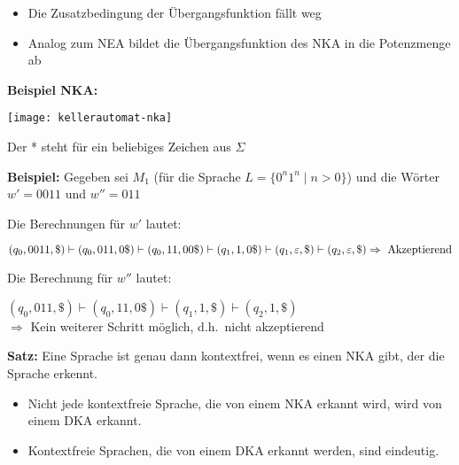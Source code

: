 \begin{itemize}
    \item Die Zusatzbedingung der Übergangsfunktion fällt weg
    \item Analog zum NEA bildet die Übergangsfunktion des NKA in die Potenzmenge ab
\end{itemize}

\textbf{Beispiel NKA:}

\texttt{[image: kellerautomat-nka]}

Der * steht für ein beliebiges Zeichen aus $\Sigma$

\textbf{Beispiel:} Gegeben sei $M_1$ (für die Sprache $L = \{ 0^n 1^n \mid n > 0 \}$) und die Wörter $w' = 0011$ und $w'' = 011$

Die Berechnungen für $w'$ lautet:

$(q_0, 0011, \$) \vdash (q_0, 011, 0\$) \vdash (q_0, 11, 00\$) \vdash (q_1, 1, 0\$) \vdash (q_1, \varepsilon, \$) \vdash (q_2, \varepsilon, \$) \\
\Rightarrow \text{ Akzeptierend}$

Die Berechnung für $w''$ lautet:

$(q_0, 011, \$) \vdash (q_0, 11, 0\$) \vdash (q_1, 1, \$) \vdash (q_2, 1, \$)$ \\
$\Rightarrow$ Kein weiterer Schritt möglich, d.h.\ nicht akzeptierend

\textbf{Satz:} Eine Sprache ist genau dann kontextfrei, wenn es einen NKA gibt, der die Sprache erkennt.
\begin{itemize}
    \item Nicht jede kontextfreie Sprache, die von einem NKA erkannt wird, wird von einem DKA erkannt.
    \item Kontextfreie Sprachen, die von einem DKA erkannt werden, sind eindeutig.
\end{itemize}